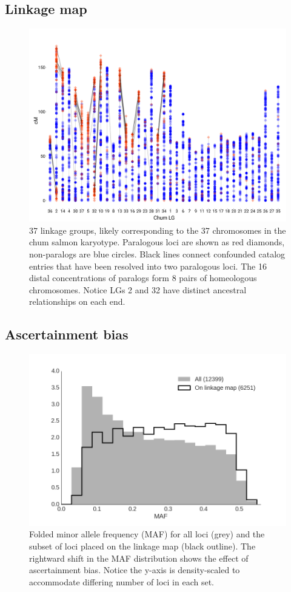 \documentclass[12pt, one column]{article}
\begin{document}
\subsection*{Linkage map}
\begin{figure}[H]
\includegraphics[scale=.26]{figures/chum_map.png}
\caption[Linkage map of chum salmon]{37 linkage groups, likely corresponding to the 37 chromosomes in the chum salmon karyotype. Paralogous loci are shown as red diamonds, non-paralogs are blue circles. Black lines connect confounded catalog entries that have been resolved into two paralogous loci. The 16 distal concentrations of paralogs form 8 pairs of homeologous chromosomes. Notice LGs 2 and 32 have distinct ancestral relationships on each end.}
\end{figure}


\subsection*{Ascertainment bias}
\begin{figure}[H]
\includegraphics[scale=.5]{figures/supplemental/ascertainment.png}
\caption[MAF Histogram showing ascertainment bias]{Folded minor allele frequency (MAF) for all loci (grey) and the subset of loci placed on the linkage map (black outline). The rightward shift in the MAF distribution shows the effect of ascertainment bias.  Notice the y-axis is density-scaled to accommodate differing number of loci in each set.}
\end{figure}
\end{document}
